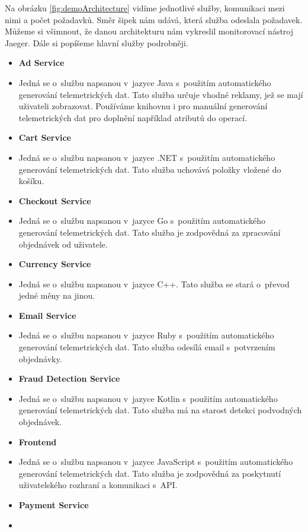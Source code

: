 Na obrázku \ref{fig:demoArchitecture} vidíme jednotlivé služby, komunikaci mezi nimi a počet požadavků. Směr šipek nám udává, která služba odeslala požadavek. Můžeme si všimnout, že danou architekturu nám vykreslil monitorovací nástroj Jaeger. Dále si popíšeme hlavní služby podrobněji.
\begin{itemize}
        \item{\textbf{Ad Service}}
        \item[]
        Jedná se o~službu napsanou v~jazyce Java s~použitím automatického generování telemetrických dat. Tato služba určuje vhodné reklamy, jež se mají uživateli zobrazovat. Používáme knihovnu i pro manuální generování telemetrických dat pro doplnění například atributů do operací.
        \item{\textbf{Cart Service}}
        \item[]
        Jedná se o~službu napsanou v~jazyce .NET s~použitím automatického generování telemetrických dat. Tato služba uchovává položky vložené do košíku.
        \item{\textbf{Checkout Service}}
        \item[]
        Jedná se o~službu napsanou v~jazyce Go s~použitím automatického generování telemetrických dat. Tato služba je zodpovědná za zpracování objednávek od uživatele.
        \item{\textbf{Currency Service}}
        \item[]
        Jedná se o~službu napsanou v~jazyce C++. Tato služba se stará o~převod jedné měny na jinou.
        \item{\textbf{Email Service}}
        \item[]
        Jedná se o~službu napsanou v~jazyce Ruby s~použitím automatického generování telemetrických dat. Tato služba odesílá email s~potvrzením objednávky.
        \item{\textbf{Fraud Detection Service}}
        \item[]
        Jedná se o~službu napsanou v~jazyce Kotlin s~použitím automatického generování telemetrických dat. Tato služba má na starost detekci podvodných objednávek.
        \item{\textbf{Frontend}}
        \item[]
        Jedná se o~službu napsanou v~jazyce JavaScript s~použitím automatického generování telemetrických dat. Tato služba je zodpovědná za poskytnutí uživatelského rozhraní a komunikaci s~API.
        \item{\textbf{Payment Service}}
        \item[]

\end{itemize}
